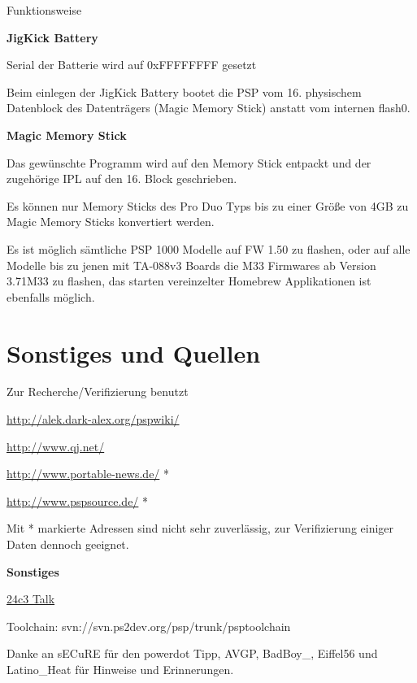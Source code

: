 \documentclass[mode=print,paper=screen,size=10pt,style=paintings]{powerdot}
\begin{document}
\begin{slide}{Funktionsweise}
	\begin{large}\textbf{JigKick Battery}\end{large}
	\begin{list}{-}{}
		\item{Serial der Batterie wird auf 0xFFFFFFFF gesetzt}
		\item{Beim einlegen der JigKick Battery bootet die PSP vom 16. physischem Datenblock des Datenträgers
			(Magic Memory Stick) anstatt vom internen flash0.}
	\end{list}
	\begin{large}\textbf{Magic Memory Stick}\end{large}
	\begin{list}{-}{}
		\item{Das gewünschte Programm wird auf den Memory Stick entpackt und der zugehörige IPL auf den 16. Block geschrieben.}
		\item{Es können nur Memory Sticks des Pro Duo Typs bis zu einer Größe von 4GB zu Magic Memory Sticks konvertiert
			werden.}
		\item{Es ist möglich sämtliche PSP 1000 Modelle auf FW 1.50 zu flashen, oder auf alle Modelle bis zu jenen mit TA-088v3
			Boards die M33 Firmwares ab Version 3.71M33 zu flashen, das starten vereinzelter Homebrew Applikationen ist
			ebenfalls möglich.}
	\end{list}
\end{slide}



\section{Sonstiges und Quellen}
\begin{slide}{Zur Recherche/Verifizierung benutzt}
	\begin{list}{-}{}
		\item{\url{http://alek.dark-alex.org/pspwiki/}}
		\item{\url{http://www.qj.net/}}
		\item{\url{http://www.portable-news.de/} *}
		\item{\url{http://www.pspsource.de/} *}
	\end{list}
	Mit * markierte Adressen sind nicht sehr zuverlässig, zur Verifizierung einiger Daten dennoch geeignet.\linebreak
	\linebreak\linebreak
	\begin{large}\textbf{Sonstiges}\end{large}
	\begin{list}{-}{}
		\item{\href{http://dewy.fem.tu-ilmenau.de/CCC/24C3/matroska/24c3-2209-en-playstation_portable_cracking.mkv}{24c3 Talk}}
		\item{Toolchain: svn://svn.ps2dev.org/psp/trunk/psptoolchain}
	\end{list}
	Danke an sECuRE für den powerdot Tipp, AVGP, BadBoy\_, Eiffel56 und Latino\_Heat für Hinweise und Erinnerungen.
\end{slide}
\end{document}
